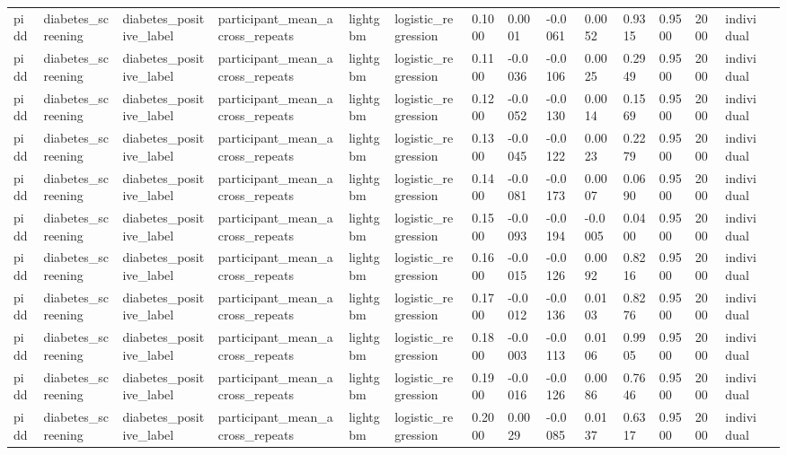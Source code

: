 \begin{tabular}{lllllllllllllll}
pidd & diabetes\_screening & diabetes\_positive\_label & participant\_mean\_across\_repeats & lightgbm & logistic\_regression & 0.1000 & 0.0001 & -0.0061 & 0.0052 & 0.9315 & 0.9500 & 2000 & individual &  \\
pidd & diabetes\_screening & diabetes\_positive\_label & participant\_mean\_across\_repeats & lightgbm & logistic\_regression & 0.1100 & -0.0036 & -0.0106 & 0.0025 & 0.2949 & 0.9500 & 2000 & individual &  \\
pidd & diabetes\_screening & diabetes\_positive\_label & participant\_mean\_across\_repeats & lightgbm & logistic\_regression & 0.1200 & -0.0052 & -0.0130 & 0.0014 & 0.1569 & 0.9500 & 2000 & individual &  \\
pidd & diabetes\_screening & diabetes\_positive\_label & participant\_mean\_across\_repeats & lightgbm & logistic\_regression & 0.1300 & -0.0045 & -0.0122 & 0.0023 & 0.2279 & 0.9500 & 2000 & individual &  \\
pidd & diabetes\_screening & diabetes\_positive\_label & participant\_mean\_across\_repeats & lightgbm & logistic\_regression & 0.1400 & -0.0081 & -0.0173 & 0.0007 & 0.0690 & 0.9500 & 2000 & individual &  \\
pidd & diabetes\_screening & diabetes\_positive\_label & participant\_mean\_across\_repeats & lightgbm & logistic\_regression & 0.1500 & -0.0093 & -0.0194 & -0.0005 & 0.0400 & 0.9500 & 2000 & individual &  \\
pidd & diabetes\_screening & diabetes\_positive\_label & participant\_mean\_across\_repeats & lightgbm & logistic\_regression & 0.1600 & -0.0015 & -0.0126 & 0.0092 & 0.8216 & 0.9500 & 2000 & individual &  \\
pidd & diabetes\_screening & diabetes\_positive\_label & participant\_mean\_across\_repeats & lightgbm & logistic\_regression & 0.1700 & -0.0012 & -0.0136 & 0.0103 & 0.8276 & 0.9500 & 2000 & individual &  \\
pidd & diabetes\_screening & diabetes\_positive\_label & participant\_mean\_across\_repeats & lightgbm & logistic\_regression & 0.1800 & -0.0003 & -0.0113 & 0.0106 & 0.9905 & 0.9500 & 2000 & individual &  \\
pidd & diabetes\_screening & diabetes\_positive\_label & participant\_mean\_across\_repeats & lightgbm & logistic\_regression & 0.1900 & -0.0016 & -0.0126 & 0.0086 & 0.7646 & 0.9500 & 2000 & individual &  \\
pidd & diabetes\_screening & diabetes\_positive\_label & participant\_mean\_across\_repeats & lightgbm & logistic\_regression & 0.2000 & 0.0029 & -0.0085 & 0.0137 & 0.6317 & 0.9500 & 2000 & individual &  \\

\end{tabular}
